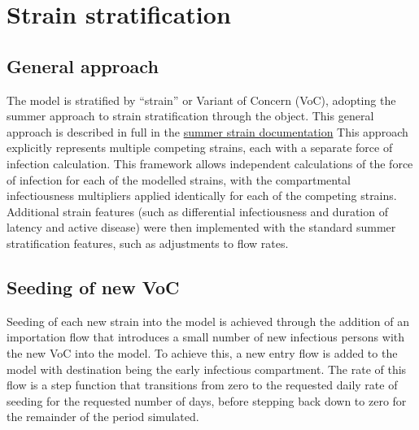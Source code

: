\section{Strain stratification} \label{strain}
\subsection{General approach}
The model is stratified by ``strain'' or Variant of Concern (VoC),
adopting the summer approach to strain stratification 
through the  object.
This general approach is described in full in the 
\href{http://summerepi.com/examples/8-strain-stratification.html}{summer strain documentation} 
This approach explicitly represents multiple competing strains,
each with a separate force of infection calculation.
This framework allows independent calculations of 
the force of infection for each of the modelled strains,
with the compartmental infectiousness multipliers applied identically 
for each of the competing strains.
Additional strain features 
(such as differential infectiousness and duration of latency and active disease)
were then implemented with the standard summer stratification features,
such as adjustments to flow rates.

\subsection{Seeding of new VoC}
Seeding of each new strain into the model 
is achieved through the addition of an importation flow
that introduces a small number of new infectious persons with the new VoC into the model.
To achieve this, 
a new entry flow is added to the model 
with destination being the early infectious compartment.
The rate of this flow is a step function that transitions from zero 
to the requested daily rate of seeding for the requested number of days,
before stepping back down to zero for the remainder of the period simulated.
